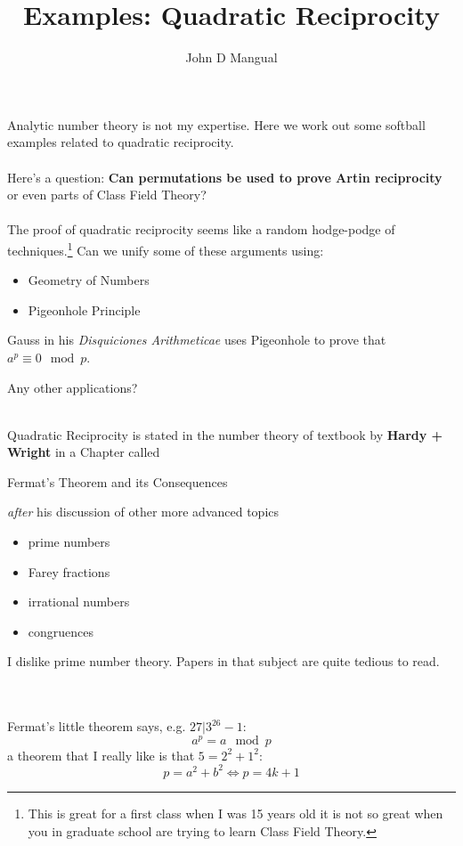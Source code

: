 \documentclass[12pt]{article}
\title{\textbf{ Examples:  Quadratic Reciprocity}}
\author{John D Mangual}
\date{}
\begin{document}
\selectfont \fontsize{25}{30}\selectfont

\maketitle

\noindent Analytic number theory is not my expertise.  Here we work out some softball examples related to quadratic reciprocity. \\ \\
Here's a question: \textbf{Can permutations be used to prove Artin reciprocity} or even parts of Class Field Theory? \\ \\
The proof of quadratic reciprocity seems like a random hodge-podge of techniques.\footnote{This is great for a first class when I was 15 years old it is not so great when you in graduate school are trying to learn Class Field Theory.} Can we unify some of these arguments using:
\begin{itemize}
\item Geometry of Numbers
\item Pigeonhole Principle
\end{itemize}
Gauss in his \textit{Disquiciones Arithmeticae} uses Pigeonhole to prove that $a^p \equiv 0 \mod p$. 

\newpage 

\noindent Any other applications? \\
 \\
Quadratic Reciprocity is stated in the number theory of textbook by \textbf{Hardy + Wright} in a Chapter called 
\begin{center} {\color{green!80!white}Fermat's Theorem and its Consequences}\end{center} \textit{after} his discussion of other more advanced topics
\begin{itemize}
\item prime numbers
\item Farey fractions
\item irrational numbers
\item congruences
\end{itemize}
I dislike prime number theory.  Papers in that subject are quite tedious to read.\\ 
 \\
\\
Fermat's little theorem says, e.g. $27| 3^{26}-1$:
$$ a^p = a \mod p$$
a theorem that I really like is that $5 = 2^2 + 1^2$:
$$ p = a^2 + b^2 \iff p = 4k+1 $$
\end{document}
